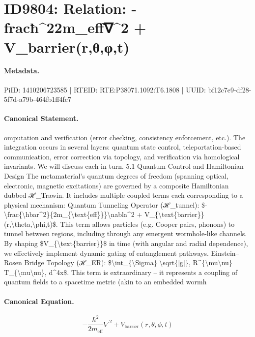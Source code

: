 \section*{ID9804: Relation: -fracħ\textasciicircum{}22m\_eff∇\textasciicircum{}2 + V\_barrier(r,θ,φ,t)}
\paragraph{Metadata.}
PiID: 1410206723585 | RTEID: RTE:P38071.1092:T6.1808 | UUID: bf12c7e9-df28-5f7d-a79b-464fb1ff4fc7

\paragraph{Canonical Statement.}
omputation and verification (error checking, consistency enforcement, etc.). The integration occurs in several layers: quantum state control, teleportation-based communication, error correction via topology, and verification via homological invariants. We will discuss each in turn. 5.1 Quantum Control and Hamiltonian Design The metamaterial’s quantum degrees of freedom (spanning optical, electronic, magnetic excitations) are governed by a composite Hamiltonian dubbed ℋ\_Trawin. It includes multiple coupled terms each corresponding to a physical mechanism: Quantum Tunneling Operator (ℋ\_tunnel): \$-\textbackslash{}frac\{\textbackslash{}hbar\textasciicircum{}2\}\{2m\_\{\textbackslash{}text\{eff\}\}\}\textbackslash{}nabla\textasciicircum{}2 + V\_\{\textbackslash{}text\{barrier\}\}(r,\textbackslash{}theta,\textbackslash{}phi,t)\$. This term allows particles (e.g. Cooper pairs, phonons) to tunnel between regions, including through any emergent wormhole-like channels. By shaping \$V\_\{\textbackslash{}text\{barrier\}\}\$ in time (with angular and radial dependence), we effectively implement dynamic gating of entanglement pathways. Einstein–Rosen Bridge Topology (ℋ\_ER): \$\textbackslash{}int\_\{\textbackslash{}Sigma\} \textbackslash{}sqrt\{|g|\}, R\textasciicircum{}\{\textbackslash{}mu\textbackslash{}nu\} T\_\{\textbackslash{}mu\textbackslash{}nu\}, d\textasciicircum{}4x\$. This term is extraordinary – it represents a coupling of quantum fields to a spacetime metric (akin to an embedded wormh

\paragraph{Canonical Equation.}
\[
-\frac{\hbar^2}{2m_{\text{eff}}}\nabla^2 + V_{\text{barrier}}(r,\theta,\phi,t)
\]

